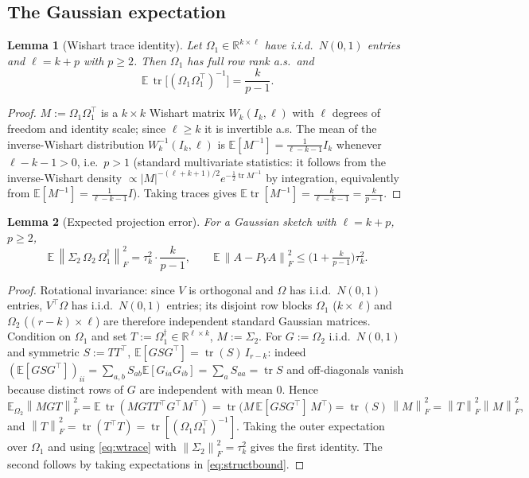 \documentclass{amsart}
\newtheorem{lemma}{Lemma}
\theoremstyle{definition}
\DeclareMathOperator{\tr}{tr}
\newcommand{\R}{\mathbb{R}}
\newcommand{\Frob}[1]{\left\lVert #1\right\rVert_F}
\newcommand{\E}{\mathbb{E}}
\begin{document}
\subsection{The Gaussian expectation}

\begin{lemma}[Wishart trace identity]\label{lem:wishart}
Let $\Omega_1\in\R^{k\times\ell}$ have i.i.d.\ $N(0,1)$ entries and
$\ell=k+p$ with $p\ge2$. Then $\Omega_1$ has full row rank a.s.\ and
\begin{equation}\label{eq:wtrace}
\E\,\tr\!\big[(\Omega_1\Omega_1^\top)^{-1}\big]=\frac{k}{p-1}.
\end{equation}
\end{lemma}

\begin{proof}
$M:=\Omega_1\Omega_1^\top$ is a $k\times k$ Wishart matrix $W_k(I_k,\ell)$ with
$\ell$ degrees of freedom and identity scale; since $\ell\ge k$ it is invertible
a.s. The mean of the inverse-Wishart distribution
$W_k^{-1}(I_k,\ell)$ is $\E[M^{-1}]=\frac{1}{\ell-k-1}I_k$ whenever
$\ell-k-1>0$, i.e.\ $p>1$ (standard multivariate statistics: it follows from the
inverse-Wishart density $\propto |M|^{-(\ell+k+1)/2}e^{-\tfrac12\tr M^{-1}}$ by
integration, equivalently from $\E[M^{-1}]=\frac{1}{\ell-k-1}I$). Taking traces
gives $\E\tr[M^{-1}]=\frac{k}{\ell-k-1}=\frac{k}{p-1}$.
\end{proof}

\begin{lemma}[Expected projection error]\label{lem:gauss}
For a Gaussian sketch with $\ell=k+p$, $p\ge2$,
\begin{equation}\label{eq:gaussexp}
\E\,\Frob{\Sigma_2\,\Omega_2\,\Omega_1^{\dagger}}^2
=\tau_k^2\cdot\frac{k}{p-1},\qquad
\E\,\Frob{A-P_Y A}^2\le\Big(1+\tfrac{k}{p-1}\Big)\tau_k^2 .
\end{equation}
\end{lemma}

\begin{proof}
Rotational invariance: since $V$ is orthogonal and $\Omega$ has i.i.d.\
$N(0,1)$ entries, $V^\top\Omega$ has i.i.d.\ $N(0,1)$ entries; its disjoint row
blocks $\Omega_1$ ($k\times\ell$) and $\Omega_2$ ($(r-k)\times\ell$) are
therefore independent standard Gaussian matrices. Condition on $\Omega_1$ and
set $T:=\Omega_1^{\dagger}\in\R^{\ell\times k}$, $M:=\Sigma_2$. For
$G:=\Omega_2$ i.i.d.\ $N(0,1)$ and symmetric $S:=TT^\top$,
$\E[GSG^\top]=\tr(S)\,I_{r-k}$: indeed
$(\E[GSG^\top])_{ii}=\sum_{a,b}S_{ab}\E[G_{ia}G_{ib}]=\sum_aS_{aa}=\tr S$ and
off-diagonals vanish because distinct rows of $G$ are independent with mean $0$.
Hence
\[
\E_{\Omega_2}\Frob{MGT}^2=\E\,\tr(MGTT^\top G^\top M^\top)
=\tr\!\big(M\,\E[GSG^\top]\,M^\top\big)=\tr(S)\,\Frob{M}^2
=\Frob{T}^2\Frob{M}^2,
\]
and $\Frob{T}^2=\tr(T^\top T)=\tr[(\Omega_1\Omega_1^\top)^{-1}]$. Taking the
outer expectation over $\Omega_1$ and using \eqref{eq:wtrace} with
$\Frob{\Sigma_2}^2=\tau_k^2$ gives the first identity. The second follows by
taking expectations in \eqref{eq:structbound}.
\end{proof}
\end{document}
